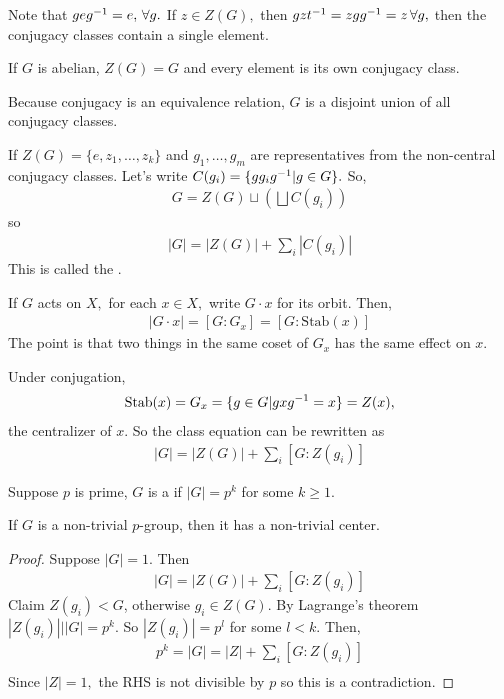 \documentclass[a4paper]{article}
\begin{document}
Note that $geg^{-1}=e,\,\forall g.$ If $z\in Z(G),$ then $gzt^{-1}=zgg^{-1}=z\,\forall g,$ then the conjugacy classes contain a single element.

If $G$ is abelian, $Z(G)=G$ and every element is its own conjugacy class.

Because conjugacy is an equivalence relation, $G$ is a disjoint union of all conjugacy classes.

If $Z(G)=\{e,z_1,\dots,z_k\}$ and $g_1,\dots,g_m$ are representatives from the non-central conjugacy classes. Let's write $C(g_i)=\{gg_ig^{-1}|g\in G\}.$ So,\begin{align}
    G=Z(G)\sqcup\left(\bigsqcup C(g_i)\right)
\end{align}
so \begin{align}
    |G|=|Z(G)|+\sum_i|C(g_i)|
\end{align}
This is called the .\begin{theorem}
    If $G$ acts on $X,$ for each $x\in X,$ write $G\cdot x$ for its orbit. Then,\begin{align}
        |G\cdot x|=[G:G_x]=[G:\mathrm{Stab}(x)]
    \end{align}
    The point is that two things in the same coset of $G_x$ has the same effect on $x$.
\end{theorem}
Under conjugation, \begin{align}
    \mathrm{Stab}(x)=G_x=\{g\in G|gxg^{-1}=x\}=Z(x),
\end{align}
the centralizer of $x$. So the class equation can be rewritten as \begin{align}
    |G|=|Z(G)|+\sum_{i}[G:Z(g_i)]
\end{align}
\begin{definition}[$p$-group]
    Suppose $p$ is prime, $G$ is a  if $|G|=p^k$ for some $k\geq 1.$
\end{definition}
\begin{theorem}
    If $G$ is a non-trivial $p$-group, then it has a non-trivial center.
    \begin{proof}
        Suppose $|G|=1.$ Then \begin{align}
            |G|=|Z(G)|+\sum_{i}[G:Z(g_i)]
        \end{align}
        Claim $Z(g_i)<G$, otherwise $g_i\in Z(G).$ By Lagrange's theorem $|Z(g_i)|\Big||G|=p^k.$ So $|Z(g_i)|=p^l$ for some $l<k.$ Then,\begin{align}
            p^k=|G|=|Z|+\sum_{i}[G:Z(g_i)]\\
        \end{align} 
        Since $|Z|=1,$ the RHS is not divisible by $p$ so this is a contradiction.
    \end{proof}
\end{theorem}
\end{document}
